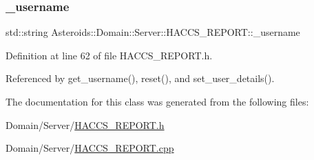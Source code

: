 \mbox{\label{classAsteroids_1_1Domain_1_1Server_1_1HACCS__REPORT_a9038844567cdd62d4ea9094ba76f21fa}} 
\subsubsection{\texorpdfstring{\+\_\+username}{\_username}}
{\footnotesize\ttfamily std\+::string Asteroids\+::\+Domain\+::\+Server\+::\+H\+A\+C\+C\+S\+\_\+\+R\+E\+P\+O\+R\+T\+::\+\_\+username\hspace{0.3cm}{\ttfamily [private]}}



Definition at line 62 of file H\+A\+C\+C\+S\+\_\+\+R\+E\+P\+O\+R\+T.\+h.



Referenced by get\+\_\+username(), reset(), and set\+\_\+user\+\_\+details().



The documentation for this class was generated from the following files\+:\begin{DoxyCompactItemize}
\item 
Domain/\+Server/\hyperlink{HACCS__REPORT_8h}{H\+A\+C\+C\+S\+\_\+\+R\+E\+P\+O\+R\+T.\+h}\item 
Domain/\+Server/\hyperlink{HACCS__REPORT_8cpp}{H\+A\+C\+C\+S\+\_\+\+R\+E\+P\+O\+R\+T.\+cpp}\end{DoxyCompactItemize}
